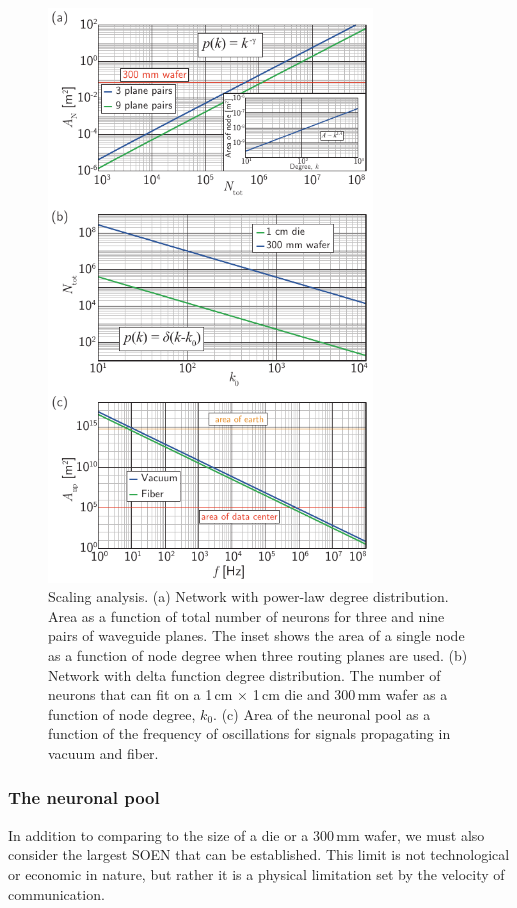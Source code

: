 \documentclass[aip,amsmath,amssymb,reprint,nofootinbib]{revtex4-1}
\begin{document}
 \begin{figure}[t!]
	\centerline{\includegraphics[width=8.6cm]{_networks_scaling_small.pdf}}
	\caption{\label{fig:networks_scaling}Scaling analysis. (a) Network with power-law degree distribution. Area as a function of total number of neurons for three and nine pairs of waveguide planes. The inset shows the area of a single node as a function of node degree when three routing planes are used. (b) Network with delta function degree distribution. The number of neurons that can fit on a 1\,cm $\times$ 1\,cm die and 300\,mm wafer as a function of node degree, $k_0$. (c) Area of the neuronal pool as a function of the frequency of oscillations for signals propagating in vacuum and fiber.}
\end{figure}

\subsubsection{\label{sec:neuronalPool}The neuronal pool}
In addition to comparing to the size of a die or a 300\,mm wafer, we must also consider the largest SOEN that can be established. This limit is not technological or economic in nature, but rather it is a physical limitation set by the velocity of communication. 
\end{document}
